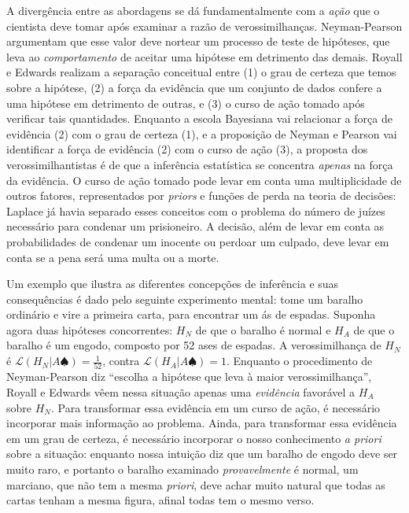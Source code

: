 A divergência entre as abordagens se dá fundamentalmente com a {\em ação} que o cientista deve tomar após examinar a 
razão de verossimilhanças. Neyman-Pearson argumentam que esse valor deve nortear um processo de teste de hipóteses, que
leva ao {\em comportamento} de aceitar uma hipótese em detrimento das demais. Royall e Edwards realizam a separação
conceitual entre (1) o grau de certeza que temos sobre a hipótese, (2) a força da evidência que um conjunto de dados confere
a uma hipótese em detrimento de outras, e (3) o curso de ação tomado após verificar tais quantidades. Enquanto a escola
Bayesiana vai relacionar a força de evidência (2) com o grau de certeza (1), e a proposição de Neyman e Pearson vai 
identificar a força de evidência (2) com o curso de ação (3), a proposta dos verossimilhantistas é de que a inferência
estatística se concentra {\em apenas} na força da evidência. O curso de ação tomado
pode levar em conta uma multiplicidade de outros fatores, representados por {\em priors} e funções de perda na teoria de 
decisões: Laplace já havia separado esses conceitos com o problema do 
número de juízes necessário para condenar um prisioneiro. A decisão, além de levar em conta as probabilidades de
condenar um inocente ou perdoar um culpado, deve levar em conta se a
pena será uma multa ou a morte.

Um exemplo que ilustra as diferentes concepções de inferência e suas consequências é dado pelo seguinte experimento
mental: tome um baralho ordinário e vire a primeira carta,
para encontrar um ás de espadas. Suponha agora duas hipóteses concorrentes: $H_N$ de que o baralho é normal e $H_A$
de que o baralho é um engodo, composto por 52 ases de espadas. A verossimilhança de $H_N$ é 
$\mathcal{L} (H_N|A \spadesuit) = \frac{1}{52}$, contra $\mathcal{L} (H_A | A \spadesuit) = 1 $. Enquanto o procedimento
de Neyman-Pearson diz ``escolha a hipótese que leva à maior verossimilhança'', Royall e Edwards vêem nessa situação
apenas uma {\em evidência} favorável a $H_A$ sobre $H_N$. Para transformar essa evidência em um curso de ação, é necessário
incorporar mais informação ao problema. 
Ainda, para transformar essa evidência em um grau de certeza,
é necessário incorporar o nosso conhecimento {\em a priori} sobre a situação: enquanto nossa intuição diz
que um baralho de engodo deve ser muito raro, e portanto o baralho examinado {\em provavelmente} é normal, um marciano,
que não tem a mesma {\em priori}, deve achar muito natural que todas as cartas tenham a mesma figura, afinal todas tem o mesmo
verso. 

